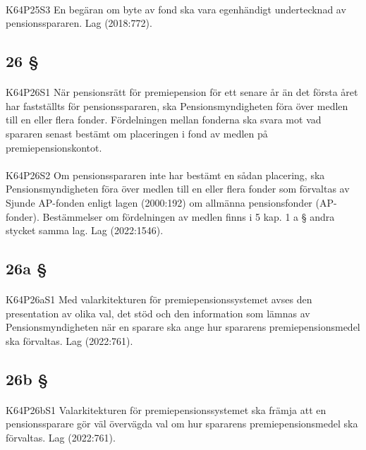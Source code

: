 \documentclass[a4paper,notitlepage,openany,10pt]{book}
\begin{document}
\paragraph*{}
{\tiny K64P25S3}
En begäran om byte av fond ska vara egenhändigt undertecknad av pensionsspararen.
Lag (2018:772).
\subsection*{26 §}
\paragraph*{}
{\tiny K64P26S1}
När pensionsrätt för premiepension för ett senare år än det första året har fastställts för pensionsspararen, ska Pensionsmyndigheten föra över medlen till en eller flera fonder. Fördelningen mellan fonderna ska svara mot vad spararen senast bestämt om placeringen i fond av medlen på premiepensionskontot.
\paragraph*{}
{\tiny K64P26S2}
Om pensionsspararen inte har bestämt en sådan placering, ska Pensionsmyndigheten föra över medlen till en eller flera fonder som förvaltas av Sjunde AP-fonden enligt lagen (2000:192) om allmänna pensionsfonder (AP-fonder). Bestämmelser om fördelningen av medlen finns i 5 kap. 1 a § andra stycket samma lag.
Lag (2022:1546).
\subsection*{26a §}
\paragraph*{}
{\tiny K64P26aS1}
Med valarkitekturen för premiepensionssystemet avses den presentation av olika val, det stöd och den information som lämnas av Pensionsmyndigheten när en sparare ska ange hur spararens premiepensionsmedel ska förvaltas.
Lag (2022:761).
\subsection*{26b §}
\paragraph*{}
{\tiny K64P26bS1}
Valarkitekturen för premiepensionssystemet ska främja att en pensionssparare gör väl övervägda val om hur spararens premiepensionsmedel ska förvaltas.
Lag (2022:761).
\end{document}
